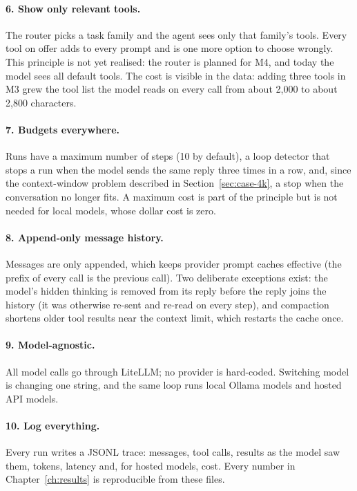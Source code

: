 \paragraph{6. Show only relevant tools.}
The router picks a task family and the agent sees only that family's tools. Every tool on offer adds to every prompt
and is one more option to choose wrongly. This principle is not yet realised: the router is planned for M4, and today
the model sees all default tools. The cost is visible in the data: adding three tools in M3 grew the tool list the
model reads on every call from about 2,000 to about 2,800 characters.

\paragraph{7. Budgets everywhere.}
Runs have a maximum number of steps (10 by default), a loop detector that stops a run when the model sends the same
reply three times in a row, and, since the context-window problem described in Section~\ref{sec:case-4k}, a stop when
the conversation no longer fits. A maximum cost is part of the principle but is not needed for local models, whose
dollar cost is zero.

\paragraph{8. Append-only message history.}
Messages are only appended, which keeps provider prompt caches effective (the prefix of every call is the previous
call). Two deliberate exceptions exist: the model's hidden thinking is removed from its reply before the reply joins
the history (it was otherwise re-sent and re-read on every step), and compaction shortens older tool results near the
context limit, which restarts the cache once.

\paragraph{9. Model-agnostic.}
All model calls go through LiteLLM; no provider is hard-coded. Switching model is changing one string, and the same
loop runs local Ollama models and hosted API models.

\paragraph{10. Log everything.}
Every run writes a JSONL trace: messages, tool calls, results as the model saw them, tokens, latency and, for hosted
models, cost. Every number in Chapter~\ref{ch:results} is reproducible from these files.

